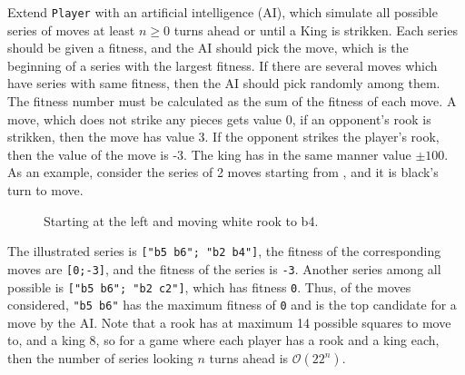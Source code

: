 Extend \lstinline{Player} with an artificial intelligence (AI), which simulate all possible series of moves at least $n \geq 0$ turns ahead or until a King is strikken. Each series should be given a fitness, and the AI should pick the move, which is the beginning of a series with the largest fitness. If there are several moves which have series with same fitness, then the AI should pick randomly among them. The fitness number must be calculated as the sum of the fitness of each move. A move, which does not strike any pieces gets value 0, if an opponent's rook is strikken, then the move has value 3. If the opponent strikes the player's rook, then the value of the move is -3. The king has in the same manner value $\pm100$. As an example, consider the series of 2 moves starting from , and it is black's turn to move.
\begin{figure}
  \centering
  \newgame
  \caption{Starting at the left and moving white rook to b4.}
  \label{fig:chessKingsGame}
\end{figure}
The illustrated series is \lstinline{["b5 b6"; "b2 b4"]}, the fitness of the corresponding moves are \lstinline{[0;-3]}, and the fitness of the series is \lstinline{-3}. Another series among all possible is \lstinline{["b5 b6"; "b2 c2"]}, which has fitness \lstinline{0}. Thus, of the moves considered,  \lstinline{"b5 b6"} has the maximum fitness of \lstinline{0} and is the top candidate for a move by the AI. Note that a rook has at maximum 14 possible squares to move to, and a king 8, so for a game where each player has a rook and a king each, then the number of series looking $n$ turns ahead is $\mathcal{O}(22^n)$.
